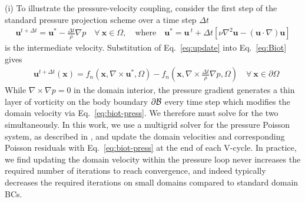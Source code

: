 \documentclass[lineno]{JFM-FLM_Au}
\begin{document}
(i) To illustrate the pressure-velocity coupling, consider the first step of the standard pressure projection scheme over a time step $\Delta t$
\begin{align}\label{eq:update}
    \bm{u}^{t+\Delta t}=\bm{u}^*-\frac {\Delta t}\rho\nabla p \quad\forall\ \bm{x}\in\Omega,\quad\text{where}\quad  \bm{u}^* = \bm{u}\,^t + \Delta t\left[\nu\nabla^2\bm{u} -\left(\bm{u}\cdot\nabla\right)\bm{u}\right]
\end{align}
is the intermediate velocity.
Substitution of Eq.~\ref{eq:update} into Eq.~\ref{eq:Biot} gives
\begin{align}\label{eq:biot-press}
    &\bm{u}^{t+\Delta t}(\bm x) = f_n(\bm x,\nabla\times\bm{u}^*,\Omega)-f_n\left(\bm x,\nabla\times\frac{\Delta t}{\rho}\nabla p,\Omega\right) \quad\forall\ \bm x \in \partial\Omega
\end{align}
While $\nabla\times\nabla p=0$ in the domain interior, the pressure gradient generates a thin layer of vorticity on the body boundary $\partial\cal B$ every time step \citep{Morton1984GeophysicalTy} which modifies the domain velocity via Eq.~\ref{eq:biot-press}.
We therefore must solve for the two simultaneously. In this work, we use a multigrid solver for the pressure Poisson system, as described in \cite{Weymouth2022Data-drivenProjection}, and update the domain velocities and corresponding Poisson residuals with Eq.~\ref{eq:biot-press} at the end of each V-cycle. In practice, we find updating the domain velocity within the pressure loop never increases the required number of iterations to reach convergence, and indeed typically decreases the required iterations on small domains compared to standard domain BCs.
\end{document}
